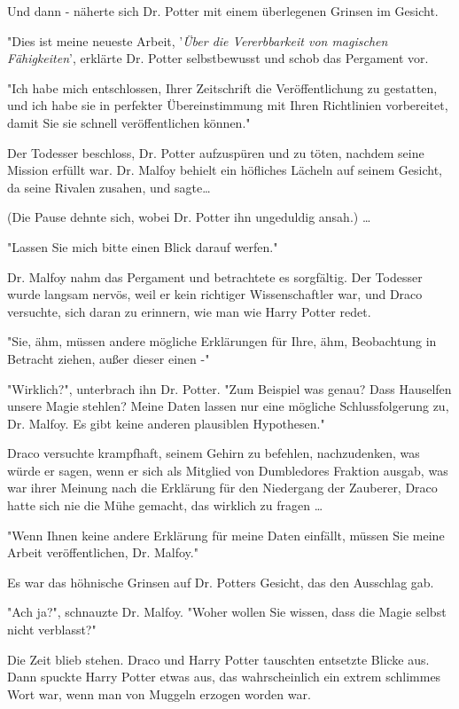 {Und dann - näherte sich Dr. Potter mit einem überlegenen Grinsen im Gesicht.

"Dies ist meine neueste Arbeit, '\emph{Über die Vererbbarkeit von magischen Fähigkeiten}', erklärte Dr. Potter selbstbewusst und schob das Pergament vor.

"Ich habe mich entschlossen, Ihrer Zeitschrift die Veröffentlichung zu gestatten, und ich habe sie in perfekter Übereinstimmung mit Ihren Richtlinien vorbereitet, damit Sie sie schnell veröffentlichen können."

Der Todesser beschloss, Dr. Potter aufzuspüren und zu töten, nachdem seine Mission erfüllt war. Dr. Malfoy behielt ein höfliches Lächeln auf seinem Gesicht, da seine Rivalen zusahen, und sagte…

(Die Pause dehnte sich, wobei Dr. Potter ihn ungeduldig ansah.) …

"Lassen Sie mich bitte einen Blick darauf werfen."

Dr. Malfoy nahm das Pergament und betrachtete es sorgfältig. Der Todesser wurde langsam nervös, weil er kein richtiger Wissenschaftler war, und Draco versuchte, sich daran zu erinnern, wie man wie Harry Potter redet.

"Sie, ähm, müssen andere mögliche Erklärungen für Ihre, ähm, Beobachtung in Betracht ziehen, außer dieser einen -"

"Wirklich?", unterbrach ihn Dr. Potter. "Zum Beispiel was genau? Dass Hauselfen unsere Magie stehlen? Meine Daten lassen nur eine mögliche Schlussfolgerung zu, Dr. Malfoy. Es gibt keine anderen plausiblen Hypothesen."

Draco versuchte krampfhaft, seinem Gehirn zu befehlen, nachzudenken, was würde er sagen, wenn er sich als Mitglied von Dumbledores Fraktion ausgab, was war ihrer Meinung nach die Erklärung für den Niedergang der Zauberer, Draco hatte sich nie die Mühe gemacht, das wirklich zu fragen …

"Wenn Ihnen keine andere Erklärung für meine Daten einfällt, müssen Sie meine Arbeit veröffentlichen, Dr. Malfoy."

Es war das höhnische Grinsen auf Dr. Potters Gesicht, das den Ausschlag gab.

"Ach ja?", schnauzte Dr. Malfoy. "Woher wollen Sie wissen, dass die Magie selbst nicht verblasst?"

Die Zeit blieb stehen. Draco und Harry Potter tauschten entsetzte Blicke aus. Dann spuckte Harry Potter etwas aus, das wahrscheinlich ein extrem schlimmes Wort war, wenn man von Muggeln erzogen worden war.

}
